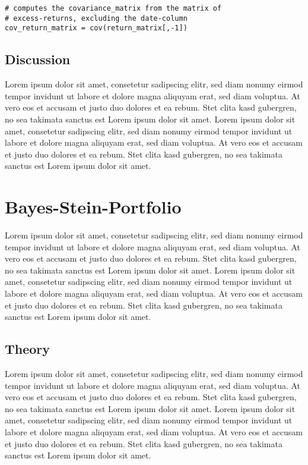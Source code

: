 \begin{lstlisting}[frame=single]
# computes the covariance_matrix from the matrix of
# excess-returns, excluding the date-column
cov_return_matrix = cov(return_matrix[,-1])
\end{lstlisting}
\subsection{Discussion}
Lorem ipsum dolor sit amet, consetetur sadipscing elitr, sed diam nonumy eirmod tempor invidunt ut labore et dolore magna aliquyam erat, sed diam voluptua. At vero eos et accusam et justo duo dolores et ea rebum. Stet clita kasd gubergren, no sea takimata sanctus est Lorem ipsum dolor sit amet. Lorem ipsum dolor sit amet, consetetur sadipscing elitr, sed diam nonumy eirmod tempor invidunt ut labore et dolore magna aliquyam erat, sed diam voluptua. At vero eos et accusam et justo duo dolores et ea rebum. Stet clita kasd gubergren, no sea takimata sanctus est Lorem ipsum dolor sit amet.


\section{Bayes-Stein-Portfolio}
Lorem ipsum dolor sit amet, consetetur sadipscing elitr, sed diam nonumy eirmod tempor invidunt ut labore et dolore magna aliquyam erat, sed diam voluptua. At vero eos et accusam et justo duo dolores et ea rebum. Stet clita kasd gubergren, no sea takimata sanctus est Lorem ipsum dolor sit amet. Lorem ipsum dolor sit amet, consetetur sadipscing elitr, sed diam nonumy eirmod tempor invidunt ut labore et dolore magna aliquyam erat, sed diam voluptua. At vero eos et accusam et justo duo dolores et ea rebum. Stet clita kasd gubergren, no sea takimata sanctus est Lorem ipsum dolor sit amet.
\subsection{Theory}
Lorem ipsum dolor sit amet, consetetur sadipscing elitr, sed diam nonumy eirmod tempor invidunt ut labore et dolore magna aliquyam erat, sed diam voluptua. At vero eos et accusam et justo duo dolores et ea rebum. Stet clita kasd gubergren, no sea takimata sanctus est Lorem ipsum dolor sit amet. Lorem ipsum dolor sit amet, consetetur sadipscing elitr, sed diam nonumy eirmod tempor invidunt ut labore et dolore magna aliquyam erat, sed diam voluptua. At vero eos et accusam et justo duo dolores et ea rebum. Stet clita kasd gubergren, no sea takimata sanctus est Lorem ipsum dolor sit amet.
